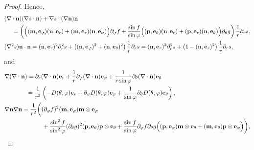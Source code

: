 \documentclass[10pt, a4paper]{article}
\newcommand\n{\mathbf{n}}
\newcommand\e{\mathbf{e}}
\newcommand\m{\mathbf{m}}
\newcommand\p{\mathbf{p}}
\newcommand\pp{\partial}
\begin{document}
\begin{proof}
Hence,
\begin{equation}\label{Cal_sn2}
  \begin{aligned}
 &  (\nabla \cdot \n)(\nabla s \cdot \n) + \nabla s \cdot (\nabla \n)\n  \\
    & ~~~~ = \left( \Bigl((\m, \e_{\varphi})(\n, \e_r) + (\m, \e_r)(\n, \e_{\varphi}) \Bigr) \pp_{\varphi} f + \frac{\sin f}{\sin \varphi} \Bigl( (\p, \e_{\theta})(\n, \e_r) + (\p, \e_r)(\n, \e_{\theta})\Bigr)  \pp_{\theta} g \right) \dfrac{1}{r} \pp_r s, \\
& (\nabla^2 s) \n \cdot \n = (\n, \e_r)^2 \pp_r^2 s + \left( (\n, \e_{\varphi})^2 + (\n, \e_{\theta})^2 \right)\frac{1}{r} \pp_r s = (\n, \e_r)^2 \pp_r^2 s + \left(1 - (\n, \e_{r})^2 \right)\frac{1}{r} \pp_r s, \\
\end{aligned}
\end{equation}
and
\begin{equation}\label{Cal_sn3}
  \begin{aligned}
    & \nabla (\nabla \cdot \n ) = \pp_r(\nabla \cdot \n) \e_r + \dfrac{1}{r} \pp_{\varphi} (\nabla \cdot \n) \e_{\varphi} + \dfrac{1}{r \sin \varphi} \pp_{\theta} (\nabla \cdot \n) \e_{\theta} \\
    & ~~~~~~~~~~~ = \dfrac{1}{r^2} \left( -  D(\theta, \varphi) \e_r + \pp_{\varphi}  D(\theta, \varphi) \e_{\varphi} + \dfrac{1}{\sin \varphi}  \pp_{\theta} D(\theta, \varphi) \e_{\theta}    \right), \\
    & \nabla \n \nabla \n = \frac{1}{r^2} \biggl( (\pp_{\varphi} f)^2 (\m, \e_{\varphi}) \m \otimes \e_{\varphi}  \\
& ~~~~~~~~~~~~~~~~~~~ + \frac{\sin^2 f}{\sin^2 \varphi} (\pp_{\theta} g)^2  (\p, \e_{\theta}) \p \otimes \e_{\theta}  + \frac{\sin f}{\sin \varphi} \pp_{\varphi} f \pp_{\theta} g \Bigl( (\p, \e_{\varphi})\m \otimes \e_{\theta} + (\m, \e_{\theta}) \p \otimes \e_{\varphi} \Bigr) \biggr), \\

\end{aligned}
\end{equation}
\end{proof}
\end{document}
